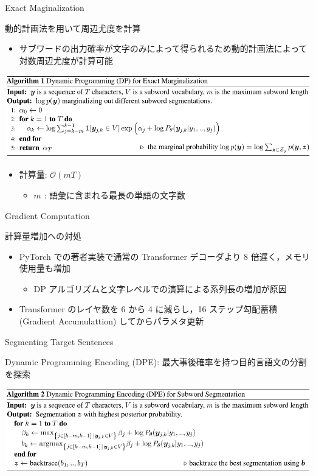 \documentclass[unicode, 12pt, aspectratio=43]{beamer}
\begin{document}
\begin{frame}[label={sec:org87578a8}]{Exact Maginalization}
\begin{block}{動的計画法を用いて周辺尤度を計算}
\begin{itemize}
\item サブワードの出力確率が文字のみによって得られるため動的計画法によって対数周辺尤度が計算可能
\end{itemize}
\begin{center}
\includegraphics[width=\linewidth]{./figure/Algorithm1.pdf}
\end{center}
\begin{itemize}
\item 計算量:  \(\mathcal{O}(mT)\)
\begin{itemize}
\item \(m\) : 語彙に含まれる最長の単語の文字数
\end{itemize}
\end{itemize}
\end{block}
\end{frame}

\begin{frame}[label={sec:orgabc43e6}]{Gradient Computation}
\begin{block}{計算量増加への対処}
\begin{itemize}
\item PyTorch での著者実装で通常の Transformer デコーダより 8 倍遅く，メモリ使用量も増加
\begin{itemize}
\item DP アルゴリズムと文字レベルでの演算による系列長の増加が原因
\end{itemize}
\item Transformer のレイヤ数を 6 から 4 に減らし，16 ステップ勾配蓄積 (Gradient Accumulattion) してからパラメタ更新
\end{itemize}
\end{block}
\end{frame}

\begin{frame}[label={sec:orga2672eb}]{Segmenting Target Sentences}
\begin{block}{Dynamic Programming Encoding (DPE): 最大事後確率を持つ目的言語文の分割を探索}
\begin{center}
\includegraphics[width=\linewidth]{./figure/Algorithm2.pdf}
\end{center}
\end{block}
\end{frame}
\end{document}
